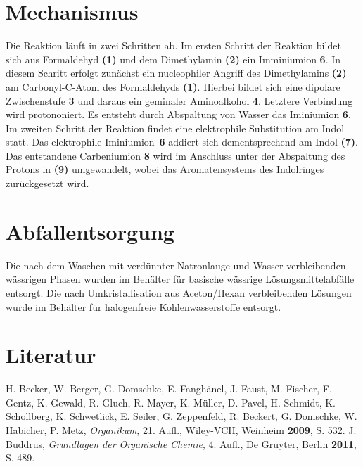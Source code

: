 \documentclass[12pt]{article}
\begin{document}
\begin{onehalfspace}
\section{Mechanismus\cite{bio}}
Die Reaktion läuft in zwei Schritten ab. Im ersten Schritt der Reaktion bildet sich aus Formaldehyd \textbf{(1)} und dem Dimethylamin \textbf{(2)} ein Imminiumion \textbf{6}. In diesem Schritt erfolgt zunächst ein nucleophiler Angriff des Dimethylamins \textbf{(2)} am Carbonyl-C-Atom des Formaldehyds \textbf{(1)}. Hierbei bildet sich eine dipolare Zwischenstufe \textbf{3} und daraus ein geminaler Aminoalkohol \textbf{4}. Letztere Verbindung wird protononiert. Es entsteht durch Abspaltung von Wasser das Iminiumion \textbf{6}. Im zweiten Schritt der Reaktion findet eine elektrophile Substitution am Indol statt. Das elektrophile \mbox{Iminiumion \textbf{6}} addiert sich dementsprechend am Indol \textbf{(7)}.
Das entstandene Carbeniumion \textbf{8} wird im Anschluss unter der Abspaltung des Protons in \mbox{} \textbf{(9)} umgewandelt, wobei das Aromatensystems des Indolringes zurückgesetzt wird.
\section{Abfallentsorgung}
Die nach dem Waschen mit verdünnter Natronlauge und Wasser verbleibenden wässrigen Phasen wurden im Behälter für basische wässrige Lösungsmittelabfälle entsorgt. Die nach Umkristallisation aus Aceton/Hexan verbleibenden Lösungen wurde im Behälter für halogenfreie Kohlenwasserstoffe entsorgt.
\section{Literatur}
\renewcommand{\section}[2]{}%
\begin{thebibliography}{}
H. Becker, W. Berger, G. Domschke, E. Fanghänel, J. Faust, M. Fischer, F. Gentz, K. Gewald, R. Gluch, R. Mayer, K. Müller, D. Pavel, H. Schmidt, K. Schollberg, K. Schwetlick, E. Seiler, G. Zeppenfeld, R. Beckert, G. Domschke, W. Habicher, P. Metz, \textit{Organikum}, 21. Aufl., Wiley-VCH, Weinheim \textbf{2009}, S. 532. 
J. Buddrus, \textit{Grundlagen der Organische Chemie}, 4. Aufl., De Gruyter, Berlin \textbf{2011}, S. 489.
\end{thebibliography}
\end{onehalfspace}
\end{document}
